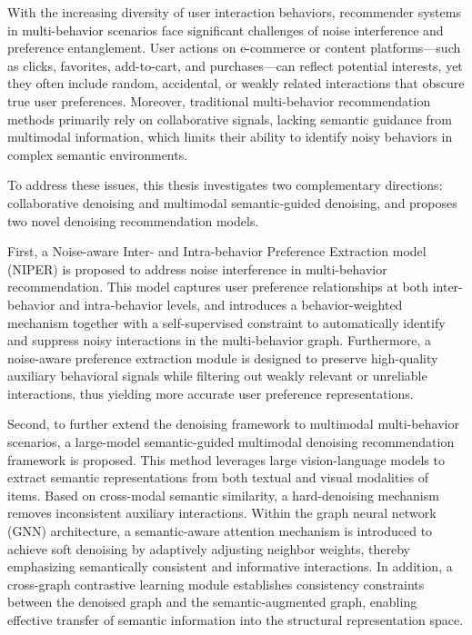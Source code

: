 \begin{eabstract}

With the increasing diversity of user interaction behaviors, recommender systems in multi-behavior scenarios face significant challenges of noise interference and preference entanglement. User actions on e-commerce or content platforms—such as clicks, favorites, add-to-cart, and purchases—can reflect potential interests, yet they often include random, accidental, or weakly related interactions that obscure true user preferences. Moreover, traditional multi-behavior recommendation methods primarily rely on collaborative signals, lacking semantic guidance from multimodal information, which limits their ability to identify noisy behaviors in complex semantic environments.

To address these issues, this thesis investigates two complementary directions: collaborative denoising and multimodal semantic-guided denoising, and proposes two novel denoising recommendation models.

First, a Noise-aware Inter- and Intra-behavior Preference Extraction model (NIPER) is proposed to address noise interference in multi-behavior recommendation. This model captures user preference relationships at both inter-behavior and intra-behavior levels, and introduces a behavior-weighted mechanism together with a self-supervised constraint to automatically identify and suppress noisy interactions in the multi-behavior graph. Furthermore, a noise-aware preference extraction module is designed to preserve high-quality auxiliary behavioral signals while filtering out weakly relevant or unreliable interactions, thus yielding more accurate user preference representations.

Second, to further extend the denoising framework to multimodal multi-behavior scenarios, a large-model semantic-guided multimodal denoising recommendation framework is proposed. This method leverages large vision-language models to extract semantic representations from both textual and visual modalities of items. Based on cross-modal semantic similarity, a hard-denoising mechanism removes inconsistent auxiliary interactions. Within the graph neural network (GNN) architecture, a semantic-aware attention mechanism is introduced to achieve soft denoising by adaptively adjusting neighbor weights, thereby emphasizing semantically consistent and informative interactions. In addition, a cross-graph contrastive learning module establishes consistency constraints between the denoised graph and the semantic-augmented graph, enabling effective transfer of semantic information into the structural representation space.


\end{eabstract}
